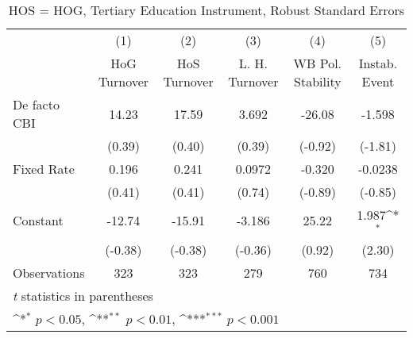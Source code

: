 \begin{table}[htbp]\centering
\def\sym#1{\ifmmode^{#1}\else\(^{#1}\)\fi}
\caption{HOS = HOG, Tertiary Education Instrument, Robust Standard Errors \label{hoshogfivs2}}
\begin{tabular}{l*{5}{c}}
\toprule
                                        &\multicolumn{1}{c}{(1)}&\multicolumn{1}{c}{(2)}&\multicolumn{1}{c}{(3)}&\multicolumn{1}{c}{(4)}&\multicolumn{1}{c}{(5)}\\
                                        &\multicolumn{1}{c}{HoG Turnover}&\multicolumn{1}{c}{HoS Turnover}&\multicolumn{1}{c}{L. H. Turnover}&\multicolumn{1}{c}{WB Pol. Stability}&\multicolumn{1}{c}{Instab. Event}\\
\midrule
De facto CBI                            &    14.23         &    17.59         &    3.692         &   -26.08         &   -1.598         \\
                                        &   (0.39)         &   (0.40)         &   (0.39)         &  (-0.92)         &  (-1.81)         \\
\addlinespace
Fixed Rate                              &    0.196         &    0.241         &   0.0972         &   -0.320         &  -0.0238         \\
                                        &   (0.41)         &   (0.41)         &   (0.74)         &  (-0.89)         &  (-0.85)         \\
\addlinespace
Constant                                &   -12.74         &   -15.91         &   -3.186         &    25.22         &    1.987\sym{*}  \\
                                        &  (-0.38)         &  (-0.38)         &  (-0.36)         &   (0.92)         &   (2.30)         \\
\midrule
Observations                            &      323         &      323         &      279         &      760         &      734         \\
\bottomrule
\multicolumn{6}{l}{\footnotesize \textit{t} statistics in parentheses}\\
\multicolumn{6}{l}{\footnotesize \sym{*} \(p<0.05\), \sym{**} \(p<0.01\), \sym{***} \(p<0.001\)}\\
\end{tabular}
\end{table}
